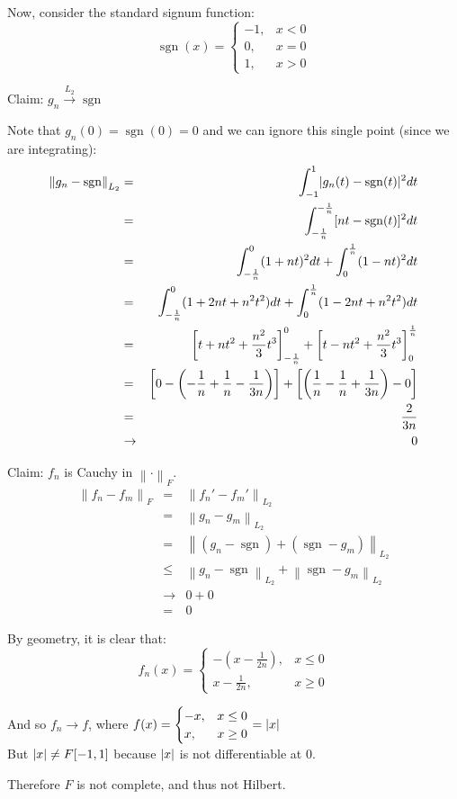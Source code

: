 \documentclass[letterpaper,12pt,fleqn]{article}
\newcommand{\inlt}{\overset{L_2}{\longrightarrow}}
\newcommand{\norm}[1]{\left\|#1\right\|}
\DeclareMathOperator{\sgn}{sgn}
\begin{document}
Now, consider the standard signum function:
\[\sgn(x)=\begin{cases}
-1, & x<0 \\
0, & x=0 \\
1, & x>0
\end{cases}\]

Claim: $g_n\inlt\sgn$

Note that $g_n(0)=\sgn(0)=0$ and we can ignore this single point (since we are
integrating):
\begin{eqnarray*}
  \norm{g_n-\sgn}_{L_2} &=& \int_{-1}^1\abs{g_n(t)-\sgn(t)}^2dt \\
  &=& \int_{-\frac{1}{n}}^{-\frac{1}{n}}[nt-\sgn(t)]^2dt \\
  &=& \int_{-\frac{1}{n}}^0(1+nt)^2dt+\int_0^{\frac{1}{n}}(1-nt)^2dt \\
  &=& \int_{-\frac{1}{n}}^0(1+2nt+n^2t^2)dt+
  \int_0^{\frac{1}{n}}(1-2nt+n^2t^2)dt \\
  &=& \left[t+nt^2+\frac{n^2}{3}t^3\right]_{-\frac{1}{n}}^0+
  \left[t-nt^2+\frac{n^2}{3}t^3\right]_0^{\frac{1}{n}} \\
  &=& \left[0-\left(-\frac{1}{n}+\frac{1}{n}-\frac{1}{3n}\right)\right]+
  \left[\left(\frac{1}{n}-\frac{1}{n}+\frac{1}{3n}\right)-0\right] \\
  &=& \frac{2}{3n} \\
  &\to& 0
\end{eqnarray*}

Claim: $f_n$ is Cauchy in $\norm{\cdot}_F$.
\begin{eqnarray*}
  \norm{f_n-f_m}_F &=& \norm{f_n'-f_m'}_{L_2} \\
  &=& \norm{g_n-g_m}_{L_2} \\
  &=& \norm{(g_n-\sgn)+(\sgn-g_m)}_{L_2} \\
  &\le& \norm{g_n-\sgn}_{L_2}+\norm{\sgn-g_m}_{L_2} \\
  &\to& 0+0 \\
  &=& 0
\end{eqnarray*}

By geometry, it is clear that:
\[f_n(x)=\begin{cases}
-\left(x-\frac{1}{2n}\right), & x\le0 \\
x-\frac{1}{2n}, & x\ge0
\end{cases}\]

And so $f_n\to f$, where
$f(x)=\begin{cases} -x, & x\le0 \\ x, & x\ge0\end{cases}=\lvert x\rvert$ \\
But $\lvert x\rvert\ne F[-1,1]$ because $\lvert x\rvert$ is not differentiable at $0$.

Therefore $F$ is not complete, and thus not Hilbert.
\end{document}
